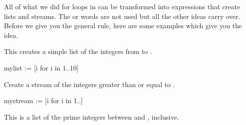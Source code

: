 {All of what we did for loops in 
can be transformed into expressions that create lists
and streams.
The   or  words are not used but
all the other ideas carry over.
Before we give you the general rule, here are some examples which
give you the idea.

\begin{xtc}
\begin{xtccomment}
This creates a simple list of the integers from  to .
\end{xtccomment}
\begin{spadsrc}
mylist := [i for i in 1..10] 
\end{spadsrc}
\begin{TeXOutput}
\begin{fricasmath}{1}
%
\end{fricasmath}
\end{TeXOutput}
\end{xtc}
\begin{xtc}
\begin{xtccomment}
Create a stream of the integers greater than or equal to .
\end{xtccomment}
\begin{spadsrc}
mystream := [i for i in 1..] 
\end{spadsrc}
\begin{TeXOutput}
\begin{fricasmath}{2}
%
\end{fricasmath}
\end{TeXOutput}
\end{xtc}
\begin{xtc}
\begin{xtccomment}
This is a list of the prime integers between  and ,
inclusive.
\end{xtccomment}
\begin{spadsrc}
\end{spadsrc}
\begin{TeXOutput}
\begin{fricasmath}{3}
%
\end{fricasmath}

\end{TeXOutput}
\end{xtc}}
